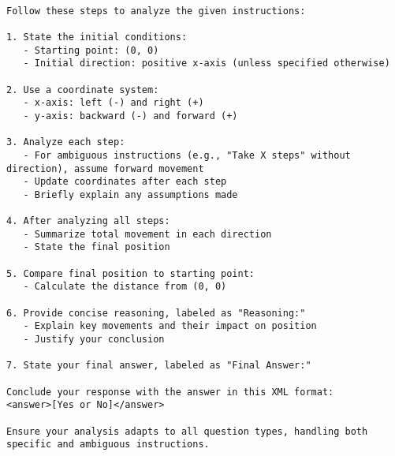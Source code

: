 \begin{tcolorbox}[title={\textbf{\small BBH-Navigate Prompt}}, boxrule=2pt, arc=0mm, breakable]
\begin{verbatim}

Follow these steps to analyze the given instructions:

1. State the initial conditions:
   - Starting point: (0, 0)
   - Initial direction: positive x-axis (unless specified otherwise)

2. Use a coordinate system:
   - x-axis: left (-) and right (+)
   - y-axis: backward (-) and forward (+)

3. Analyze each step:
   - For ambiguous instructions (e.g., "Take X steps" without direction), assume forward movement
   - Update coordinates after each step
   - Briefly explain any assumptions made

4. After analyzing all steps:
   - Summarize total movement in each direction
   - State the final position

5. Compare final position to starting point:
   - Calculate the distance from (0, 0)

6. Provide concise reasoning, labeled as "Reasoning:"
   - Explain key movements and their impact on position
   - Justify your conclusion

7. State your final answer, labeled as "Final Answer:"

Conclude your response with the answer in this XML format:
<answer>[Yes or No]</answer>

Ensure your analysis adapts to all question types, handling both specific and ambiguous instructions.

\end{verbatim}
\end{tcolorbox}

